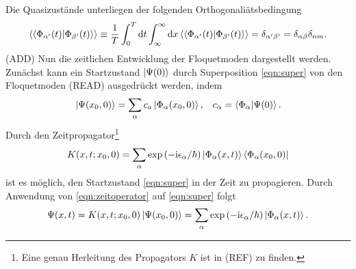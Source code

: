 Die Quasizustände unterliegen der folgenden Orthogonaliätsbedingung
\begin{align}
  \braket{\braket{\Phi_{\alpha' }(t)|\Phi_{\beta'}(t)}}\equiv \frac{1}{T} \int_0^T\mathrm{d}t \int_{\infty}^{\infty} \mathrm{d}x
   \braket{\braket{\Phi_{\alpha' }(t)|\Phi_{\beta'}(t)}}=\delta_{\alpha'\beta'}=\delta_{\alpha\beta}\delta_{nm}.
\end{align}
(ADD)
Nun die zeitlichen Entwicklung der Floquetmoden
dargestellt werden.
Zunächst kann ein Startzustand $\ket{\Psi(0)}$ durch
Superposition \eqref{eqn:super} von den Floquetmoden (READ) ausgedrückt werden, indem
\begin{align}
  \ket{\Psi(x_0,0)}=\sum_\alpha c_a\ket{\Phi_\alpha(x_0,0)},&   &c_\alpha=\braket{\Phi_\alpha|\Psi(0)}.  \label{eqn:super}
\end{align}
Durch den Zeitpropagator\footnote{Eine genau Herleitung des Propagators $K$ ist in (REF) zu finden.}
\begin{align}
  K(x,t;x_0,0)=\sum_\alpha \exp\left(-\mathrm{i}\epsilon_\alpha/ \hbar \right)\ket{\Phi_\alpha(x,t)}\bra{\Phi_\alpha(x_0,0)} \label{eqn:zeitoperator}
\end{align}
ist es möglich, den Startzustand \eqref{eqn:super}
in der Zeit zu propagieren.
Durch Anwendung von \eqref{eqn:zeitoperator} auf \eqref{eqn:super}
folgt
\begin{align}
  \Psi(x,t)=K(x,t;x_0,0) \ket{\Psi(x_0,0)}=\sum_\alpha \exp\left(-\mathrm{i}\epsilon_\alpha/ \hbar \right)\ket{\Phi_\alpha(x,t)}.
\end{align}


